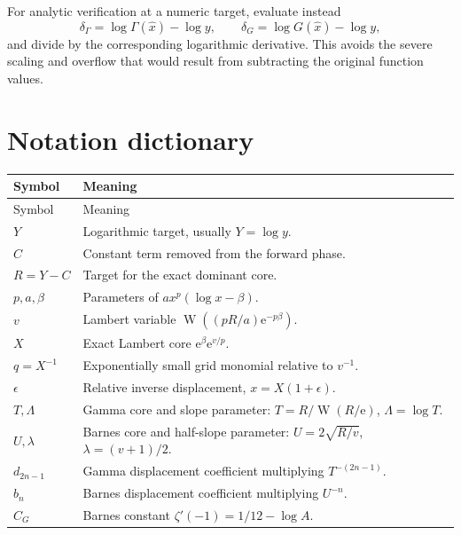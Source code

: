 \documentclass[11pt,oneside]{article}
\theoremstyle{plain}
\theoremstyle{definition}
\theoremstyle{remark}
\newcommand{\W}{\operatorname{W}}
\newcommand{\e}{\mathrm{e}}
\begin{document}
For analytic verification at a numeric target, evaluate instead
\begin{equation}
 \delta_\Gamma=\log\Gamma(\widehat x)-\log y,
 \qquad
 \delta_G=\log G(\widehat x)-\log y,
 \label{eq:numeric-log-residuals}
\end{equation}
and divide by the corresponding logarithmic derivative.  This avoids the
severe scaling and overflow that would result from subtracting the original
function values.

\section{Notation dictionary}
\label{app:notation}

\begin{longtable}{>{\raggedright\arraybackslash}p{}
                  >{\raggedright\arraybackslash}p{}}
\toprule
Symbol & Meaning\\
\midrule
\endfirsthead
\toprule
Symbol & Meaning\\
\midrule
\endhead
\(Y\) & Logarithmic target, usually \(Y=\log y\).\\
\(C\) & Constant term removed from the forward phase.\\
\(R=Y-C\) & Target for the exact dominant core.\\
\(p,a,\beta\) & Parameters of \(a x^p(\log x-\beta)\).\\
\(v\) & Lambert variable \(\W((pR/a)\e^{-p\beta})\).\\
\(X\) & Exact Lambert core \(\e^\beta\e^{v/p}\).\\
\(q=X^{-1}\) & Exponentially small grid monomial relative to \(v^{-1}\).\\
\(\epsilon\) & Relative inverse displacement, \(x=X(1+\epsilon)\).\\
\(T,\Lambda\) & Gamma core and slope parameter: \(T=R/\W(R/\e)\),
                  \(\Lambda=\log T\).\\
\(U,\lambda\) & Barnes core and half-slope parameter:
                  \(U=2\sqrt{R/v}\), \(\lambda=(v+1)/2\).\\
\(d_{2n-1}\) & Gamma displacement coefficient multiplying \(T^{-(2n-1)}\).\\
\(b_n\) & Barnes displacement coefficient multiplying \(U^{-n}\).\\
\(C_G\) & Barnes constant \(\zeta'(-1)=1/12-\log A\).\\
\bottomrule
\end{longtable}
\end{document}
